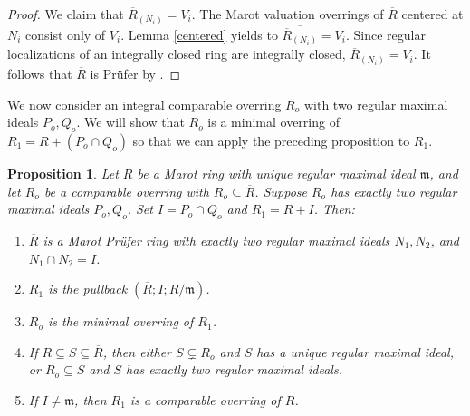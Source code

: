 \documentclass[12pt]{article}
\newtheorem{proposition}{Proposition}
\begin{document}
\begin{proof}
		\smallskip We claim that $\overline{R}_{(N_i)}=V_i$. The Marot valuation overrings of $\overline R$ centered at $N_i$ consist only of $V_i$. Lemma \ref{centered} yields to $\overline{\overline R_{(N_i)}}=V_i$. Since regular localizations of an integrally closed ring are integrally closed, $\overline R_{(N_i)}=V_i$. It follows that $\overline R$ is Prüfer by \cite[Theorem 6.2]{huckaba}.
	\end{proof}

We now consider an integral comparable overring $R_o$ with two regular maximal ideals $P_o,Q_o$. We will show that $R_o$ is a minimal overring of $R_1=R+(P_o\cap Q_o)$ so that we can apply the preceding proposition to $R_1$.

\begin{proposition}\label{comparable-two}
		Let $R$ be a Marot ring with unique regular maximal ideal $\mathfrak{m}$, and let $R_o$ be a comparable overring with $R_o\subseteq\overline R$. Suppose $R_o$ has exactly two regular maximal ideals $P_o,Q_o$. Set $I=P_o\cap Q_o$ and $R_1=R+I$. Then:
		\begin{enumerate}[label=(\roman*)]
			\item $\overline R$ is a Marot Prüfer ring with exactly two regular maximal ideals $N_1,N_2$, and $N_1\cap N_2=I$.
			\item $R_1$ is the pullback $(\overline R;I;R/\mathfrak{m})$.
			\item $R_o$ is the minimal overring of $R_1$.
			\item If $R\subseteq S\subseteq\overline R$, then either $S\subsetneq R_o$ and $S$ has a unique regular maximal ideal, or $R_o\subseteq S$ and $S$ has exactly two regular maximal ideals.
			\item If $I\neq \mathfrak{m}$, then $R_1$ is a comparable overring of $R$.
		\end{enumerate}
	\end{proposition}
\end{document}
